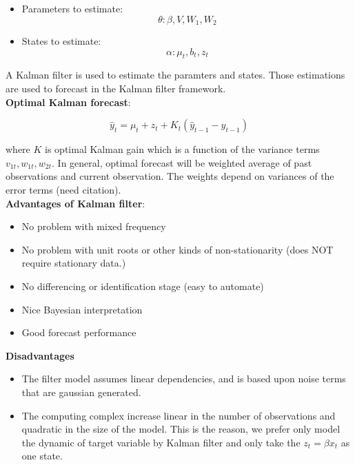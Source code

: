 \begin{itemize}
	\item {Parameters to estimate: $$\theta: \beta, V, W_{1}, W_{2}$$}
	\item {States to estimate: $$\alpha:  \mu_t, b_t,  z_t$$}
\end{itemize}




A Kalman filter is used to estimate the paramters and states. Those estimations are used to forecast in the Kalman filter framework.\\




\textbf{Optimal Kalman forecast}: 	
		
$$\hat y_t =  \mu_t + z_t + K_t ( \hat y_{t-1} - y_{t-1} )$$


where $K$ is optimal Kalman gain which is a function of the variance terms $v_{1t},w_{1t}, w_{2t}$. In general, optimal forecast will be weighted average of past observations and current observation. The weights depend on variances of the error terms (need citation).\\ 


\textbf{Advantages of Kalman filter}:

\begin{itemize}
	\item {No problem with mixed frequency }
	\item {No problem with unit roots or other kinds of non-stationarity (does NOT require stationary data.)}
	\item {No differencing or identification stage (easy to automate)}
	\item {Nice Bayesian interpretation}
	\item {Good forecast performance}
\end{itemize}



\textbf{Disadvantages} 

\begin{itemize}
	\item {The filter model assumes linear dependencies, and is based upon noise terms that are gaussian generated.}
	\item {The computing complex increase linear in the number of observations and quadratic in the size of the model. This is the reason, we prefer only model the dynamic of target variable by Kalman filter and only take the $z_t = \beta x_t$ as one state.}
\end{itemize}





